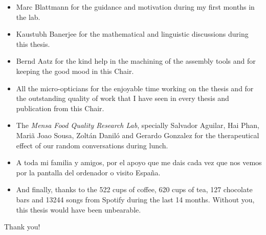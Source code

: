 \begin{itemize}
\item Marc Blattmann for the guidance and motivation during my first months in the lab.

\item Kaustubh Banerjee for the mathematical and linguistic discussions during this thesis.

\item Bernd Aatz for the kind help in the machining of the assembly tools and for keeping the good mood in this Chair.

\item All the micro-opticians for the enjoyable time working on the thesis and for the outstanding quality of work that I have seen in every thesis and publication from this Chair.

\item The \textit{Mensa Food Quality Research Lab}, specially Salvador Aguilar, Hai Phan, Mariã Joao Sousa, Zoltán Daniló and Gerardo Gonzalez for the therapeutical effect of our random conversations during lunch.

\item A toda mi familia y amigos, por el apoyo que me dais cada vez que nos vemos por la pantalla del ordenador o visito España. 

\item And finally, thanks to the 522 cups of coffee, 620 cups of tea, 127 chocolate bars and 13244 songs from Spotify during the last 14 months. Without you, this thesis would have been unbearable.
\end{itemize}

Thank you!